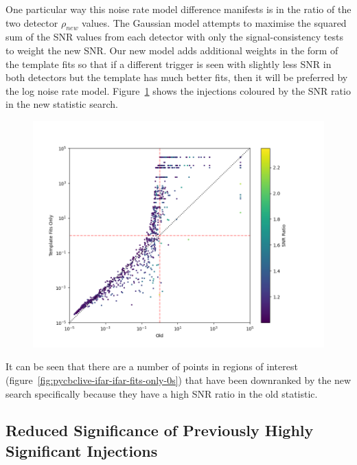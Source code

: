 One particular way this noise rate model difference manifests is in the ratio of the two detector $\rho_{new}$ values. The Gaussian model attempts to maximise the squared sum of the SNR values from each detector with only the signal-consistency tests to weight the new SNR. Our new model adds additional weights in the form of the template fits so that if a different trigger is seen with slightly less SNR in both detectors but the template has much better fits, then it will be preferred by the log noise rate model. Figure~\ref{fig:pycbclive-ifar-ifar-snr-ratio} shows the injections coloured by the SNR ratio in the new statistic search.
%
\begin{figure}
  \centering
  \begin{minipage}[t]{1.0\linewidth}
    \includegraphics[width=1\textwidth]{images/5_pycbclive/ifar_vs_ifar_snr_ratio_new.png}
  \end{minipage}
  \caption{}
  \label{fig:pycbclive-ifar-ifar-snr-ratio}
\end{figure}
%
It can be seen that there are a number of points in regions of interest (figure~\ref{fig:pycbclive-ifar-ifar-fits-only-0s}) that have been downranked by the new search specifically because they have a high SNR ratio in the old statistic.

\subsection{\label{sec:pycbclive-top-right}Reduced Significance of Previously Highly Significant Injections}

